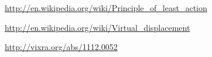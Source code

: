 \documentclass[10pt]{article}
\begin{document}
\par {}

\bigskip \medskip

\noindent \href{http://en.wikipedia.org/wiki/Principle\_of\_least\_action}{http://en.wikipedia.org/wiki/Principle\_of\_least\_action}
\par \bigskip \smallskip
\noindent \href{http://en.wikipedia.org/wiki/Virtual\_displacement}{http://en.wikipedia.org/wiki/Virtual\_displacement}
\par \bigskip \smallskip
\noindent \href{http://vixra.org/abs/1112.0052}{http://vixra.org/abs/{\small 1112.0052}}
\end{document}
